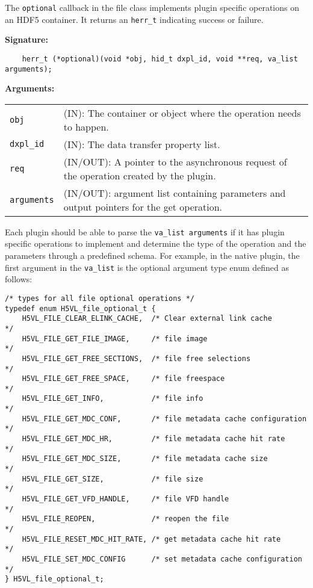 The \texttt{optional} callback in the file class implements plugin specific operations on an HDF5 container. It returns an 
\texttt{herr\_t} indicating success or failure. \bigskip
\begin{mdframed}[style=bgbox] 
\textbf{Signature:}
\begin{lstlisting}
    herr_t (*optional)(void *obj, hid_t dxpl_id, void **req, va_list arguments);
\end{lstlisting}

\textbf{Arguments:}\\
\begin{tabular}{l p{13.5cm}}
  \texttt{obj} & (IN): The container or object where the operation needs to happen.\\
  \texttt{dxpl\_id} & (IN): The data transfer property list.\\
  \texttt{req} & (IN/OUT): A pointer to the asynchronous request of the operation created by the plugin.\\
  \texttt{arguments} & (IN/OUT): argument list containing parameters and output pointers for the get operation. \\
\end{tabular}
\end{mdframed}

Each plugin should be able to parse the \texttt{va\_list arguments} if it has plugin specific operations to implement and determine the type of the operation and the parameters through a predefined schema. For example, in the native plugin, the first argument in the \texttt{va\_list} is the optional argument type enum defined as follows:

\begin{lstlisting}
/* types for all file optional operations */
typedef enum H5VL_file_optional_t {
    H5VL_FILE_CLEAR_ELINK_CACHE,  /* Clear external link cache         */
    H5VL_FILE_GET_FILE_IMAGE,     /* file image                        */
    H5VL_FILE_GET_FREE_SECTIONS,  /* file free selections              */
    H5VL_FILE_GET_FREE_SPACE,     /* file freespace                    */
    H5VL_FILE_GET_INFO,           /* file info                         */
    H5VL_FILE_GET_MDC_CONF,       /* file metadata cache configuration */
    H5VL_FILE_GET_MDC_HR,         /* file metadata cache hit rate      */
    H5VL_FILE_GET_MDC_SIZE,       /* file metadata cache size          */
    H5VL_FILE_GET_SIZE,           /* file size                         */
    H5VL_FILE_GET_VFD_HANDLE,     /* file VFD handle                   */
    H5VL_FILE_REOPEN,             /* reopen the file                   */
    H5VL_FILE_RESET_MDC_HIT_RATE, /* get metadata cache hit rate       */
    H5VL_FILE_SET_MDC_CONFIG      /* set metadata cache configuration  */
} H5VL_file_optional_t;
\end{lstlisting}

